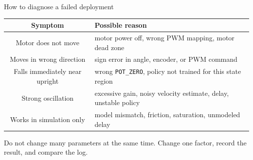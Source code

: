 \documentclass[aspectratio=169]{beamer}
\begin{document}
\begin{frame}{How to diagnose a failed deployment}

\begin{center}
\begin{tabular}{c|p{}}
\hline
\textbf{Symptom} & \textbf{Possible reason} \\
\hline
Motor does not move & motor power off, wrong PWM mapping, motor dead zone \\
\hline
Moves in wrong direction & sign error in angle, encoder, or PWM command \\
\hline
Falls immediately near upright & wrong \texttt{POT\_ZERO}, policy not trained for this state region \\
\hline
Strong oscillation & excessive gain, noisy velocity estimate, delay, unstable policy \\
\hline
Works in simulation only & model mismatch, friction, saturation, unmodeled delay \\
\hline
\end{tabular}
\end{center}

\vspace{0.2cm}


Do not change many parameters at the same time.
Change one factor, record the result, and compare the log.


\end{frame}
\end{document}
